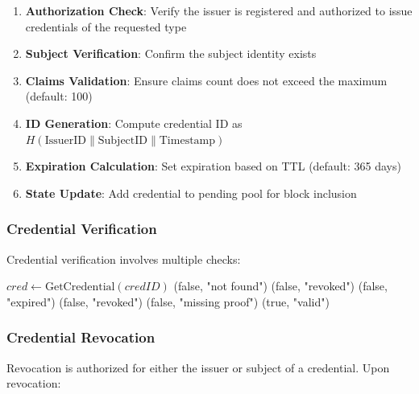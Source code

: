 \documentclass[11pt,twocolumn]{article}
\begin{document}
\begin{enumerate}
\item \textbf{Authorization Check}: Verify the issuer is registered and authorized to issue credentials of the requested type
\item \textbf{Subject Verification}: Confirm the subject identity exists
\item \textbf{Claims Validation}: Ensure claims count does not exceed the maximum (default: 100)
\item \textbf{ID Generation}: Compute credential ID as $H(\text{IssuerID} \| \text{SubjectID} \| \text{Timestamp})$
\item \textbf{Expiration Calculation}: Set expiration based on TTL (default: 365 days)
\item \textbf{State Update}: Add credential to pending pool for block inclusion
\end{enumerate}

\subsubsection{Credential Verification}

Credential verification involves multiple checks:

\begin{algorithm}
\caption{Credential Verification}
\label{alg:cred-verify}
\begin{algorithmic}[1]
    \State $cred \gets \text{GetCredential}(credID)$
        \State \Return (false, "not found")
    \EndIf
        \State \Return (false, "revoked")
    \EndIf
        \State \Return (false, "expired")
    \EndIf
        \State \Return (false, "revoked")
    \EndIf
        \State \Return (false, "missing proof")
    \EndIf
    \State \Return (true, "valid")
\EndProcedure
\end{algorithmic}
\end{algorithm}

\subsubsection{Credential Revocation}

Revocation is authorized for either the issuer or subject of a credential. Upon revocation:
\end{document}
